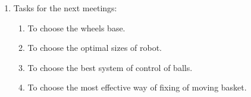 \begin{enumerate}
	\item Tasks for the next meetings:
	\begin{enumerate}
	  \item To choose the wheels base.
	  
	  \item To choose the optimal sizes of robot.
	  
	  \item To choose the best system of control of balls.
	  
	  \item To choose the most effective way of fixing of moving basket.
	  
    \end{enumerate}
\end{enumerate}
\fillpage


